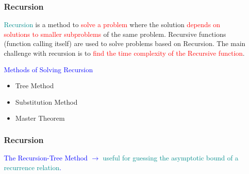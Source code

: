 \begin{frame}
    \frametitle{Recursion}
    \vspace{0.4cm} %
        \textcolor{DarkCyan}{Recursion} is a method to \textcolor{red}{solve a problem} where the solution \textcolor{red}{depends on solutions to smaller subproblems} of the same problem. Recursive functions (function calling itself) are used to solve problems based on Recursion. The main challenge with recursion is to \textcolor{red}{find the time complexity of the Recursive function}.
    \vspace{0.4cm}
    \begin{block}{\textcolor{blue}{Methods of Solving Recursion}}
    \end{block}
    \vspace{0.4cm} %

    \begin{itemize}
        \item Tree Method
        \vspace{0.3cm} %
        \item Substitution Method
        \vspace{0.3cm}
        \item Master Theorem
    \end{itemize}
    
    \vspace{0.5cm} %
\end{frame}


\begin{frame}
    \frametitle{Recursion}
    \begin{block}
       {\textcolor{blue}{The Recursion-Tree Method $\rightarrow$ \textcolor{DarkCyan}{useful for guessing the asymptotic bound of a recurrence relation}.}}
    \end{block}
    
    \vspace{0.5cm} %
\end{frame}

